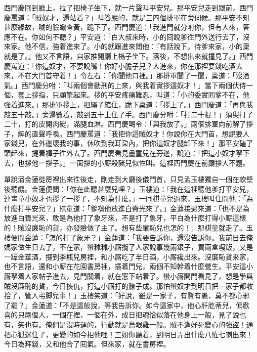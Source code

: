 西門慶囘到廳上，拉了把椅子坐下，就一片聲叫平安兒。那平安兒走到跟前，西門慶罵道：「賊奴才，還站着？」叫答應的，就是三四個排軍在旁伺候。那平安不知甚麼緣故，唬的臉蠟查黃，跪下了。西門慶道：「我進門就分咐你，但有人來，答應不在。你如何不聽？」平安道：「白大叔來時，小的囘說爹徃門外送行去了，沒來家。他不信，強着進來了。小的就跟進來問他：『有話說下，待爹來家，小的稟就是了。』他又不言語，自家推開廳上槅子坐下。落後，不想出來就撞見了。」西門慶罵道：「你這奴才，不要說嘴！你好小膽子兒？人進來，你在那裡耍錢吃酒去來，不在大門首守着！」令左右：「你聞他口裡。」那排軍聞了一聞，稟道：「沒酒氣。」西門慶分咐：「叫兩個會動刑的上來，與我着實拶這奴才！」當下兩個伏侍一個，套上拶指，只顧擎起來。拶的平安疼痛難忍，叫道：「小的委實囘爹不在，他強着進來。」那排軍拶上，把繩子綰住，跪下稟道：「拶上了。」西門慶道：「再與我敲五十敲。」旁邊數着，敲到五十上住了手。西門慶分咐：「打二十棍！」須臾打了二十，打的皮開肉綻，滿腿血淋。西門慶喝令：「與我放了。」兩個排軍向前解了拶子，解的直聲呼喚。西門慶罵道：「我把你這賊奴才！你說你在大門首，想說要人家錢兒，在外邊壞我的事，休吹到我耳朶內，把你這奴才腿卸下來！」那平安磕了頭起來，提着褲子徃外去了。西門慶看見畫童兒在旁邊，說道：「把這小奴才拏下去，也拶他一拶子。」一面拶的小厮殺豬兒似恠叫。這裡西門慶在前廳拶人不題。

單說潘金蓮從房裡出來徃後走，剛走到大廳後儀門首，只見孟玉樓獨自一個在軟壁後聽覷。金蓮便問：「你在此聽甚麼兒哩？」玉樓道：「我在這裡聽他爹打平安兒，連畫童小奴才也拶了一拶子，不知為什麼。」一囘棋童兒過來，玉樓叫住問他：「為什麼打平安兒？」棋童道：「爹嗔他放進白賚光來了。」金蓮接過來道：「也不是為放進白賚光來，敢是為他打了象牙來，不是打了象牙，平白為什麼打得小厮這樣的！賊沒廉恥的貨，亦發臉做了主了。想有些廉恥兒也怎的！」那棋童就走了。玉樓便問金蓮：「怎的打了象牙？」金蓮道：「我要告訴你，還沒告訴你。我前日去俺媽家做生日去了，不在家，蠻秫秫小厮攬了人家說事幾兩銀子，買兩盒嘎飯，又是一罈金華酒，掇到李瓶兒房裡，和小厮吃了半日酒，小厮纔出來。沒廉恥貨來家，也不言語，還和小厮在花園書房裡，插着門兒，兩個不知幹着什麼營生。平安這小厮拏着人家帖子進去，見門關着，就在窓下站着了。蠻小厮開門看見了，想是學與賊沒廉恥的貨，今日挾仇，打這小厮打的膫子成。那怕蠻奴才到明日把一家子都收拾了，管人弔脚兒事！」玉樓笑道：「好說，雖是一家子，有賢有愚，{}莫不都心邪了罷？」金蓮道：「不是這般說，等我告訴你。如今這家中，他心肝肐蒂兒，偏歡喜的只兩個人，一個在裡，一個在外，成日把魂恰似落在他身上一般，見了說也有，笑也有。俺們是沒時運的，行動就是烏眼雞一般。賊不逢好死變心的強盜！通把心狐迷住了，更變的如今相他哩！三姐你聽着，到明日弄出什麼八恠七喇出來！今日為拜錢，又和他合了囘氣。但來家，就在書房裡。

